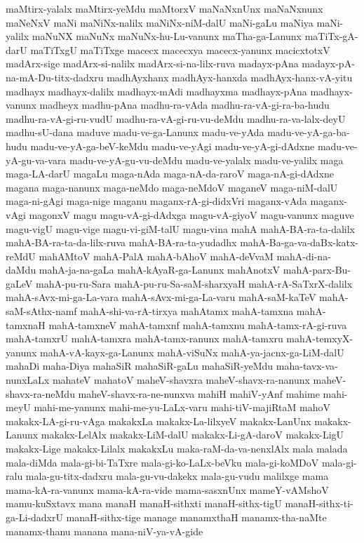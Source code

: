 {maMtirx-yalalx
maMtirx-yeMdu
maMtorxV
maNaNxnUnx
maNaNxnunx
maNeNxV
maNi
maNiNx-nalilx
maNiNx-niM-dalU
maNi-gaLu
maNiya
maNi-yalilx
maNuNX
maNuNx
maNuNx-hu-Lu-vanunx
maTha-ga-Lanunx
maTiTx-gA-darU
maTiTxgU
maTiTxge
macecx
macecxya
macecx-yanunx
macicxtotxV
madArx-sige
madArx-si-nalilx
madArx-si-na-lilx-ruva
madayx-pAna
madayx-pA-na-mA-Du-titx-dadxru
madhAyxhanx
madhAyx-hanxda
madhAyx-hanx-vA-yitu
madhayx
madhayx-dalilx
madhayx-mAdi
madhayxma
madhayx-pAna
madhayx-vanunx
madheyx
madhu-pAna
madhu-ra-vAda
madhu-ra-vA-gi-ra-ba-hudu
madhu-ra-vA-gi-ru-vudU
madhu-ra-vA-gi-ru-vu-deMdu
madhu-ra-va-lalx-deyU
madhu-sU-dana
maduve
madu-ve-ga-Lanunx
madu-ve-yAda
madu-ve-yA-ga-ba-hudu
madu-ve-yA-ga-beV-keMdu
madu-ve-yAgi
madu-ve-yA-gi-dAdxne
madu-ve-yA-gu-va-vara
madu-ve-yA-gu-vu-deMdu
madu-ve-yalalx
madu-ve-yalilx
maga
maga-LA-darU
magaLu
maga-nAda
maga-nA-da-raroV
maga-nA-gi-dAdxne
magana
maga-nanunx
maga-neMdo
maga-neMdoV
maganeV
maga-niM-dalU
maga-ni-gAgi
maga-nige
maganu
maganx-rA-gi-didxVri
maganx-vAda
maganx-vAgi
magonxV
magu
magu-vA-gi-dAdxga
magu-vA-giyoV
magu-vanunx
maguve
magu-vigU
magu-vige
magu-vi-giM-talU
magu-vina
mahA
mahA-BA-ra-ta-dalilx
mahA-BA-ra-ta-da-lilx-ruva
mahA-BA-ra-ta-yudadhx
mahA-Ba-ga-va-daBx-katx-reMdU
mahAMtoV
mahA-PalA
mahA-bAhoV
mahA-deVvaM
mahA-di-na-daMdu
mahA-ja-na-gaLa
mahA-kAyaR-ga-Lanunx
mahAnotxV
mahA-parx-Bu-gaLeV
mahA-pu-ru-Sara
mahA-pu-ru-Sa-saM-sharxyaH
mahA-rA-SaTxrX-dalilx
mahA-sAvx-mi-ga-La-vara
mahA-sAvx-mi-ga-La-varu
mahA-saM-kaTeV
mahA-saM-sAthx-namf
mahA-shi-va-rA-tirxya
mahAtamx
mahA-tamxna
mahA-tamxnaH
mahA-tamxneV
mahA-tamxnf
mahA-tamxnu
mahA-tamx-rA-gi-ruva
mahA-tamxrU
mahA-tamxra
mahA-tamx-ranunx
mahA-tamxru
mahA-temxyX-yanunx
mahA-vA-kayx-ga-Lanunx
mahA-viSuNx
mahA-ya-jacnx-ga-LiM-dalU
mahaDi
maha-Diya
mahaSiR
mahaSiR-gaLu
mahaSiR-yeMdu
maha-tavx-va-nunxLaLx
mahateV
mahatoV
maheV-shavxra
maheV-shavx-ra-nanunx
maheV-shavx-ra-neMdu
maheV-shavx-ra-ne-nunxva
mahiH
mahiV-yAnf
mahime
mahi-meyU
mahi-me-yanunx
mahi-me-yu-LaLx-varu
mahi-tiV-majiRtaM
mahoV
makakx-LA-gi-ru-vAga
makakxLa
makakx-La-lilxyeV
makakx-LanUnx
makakx-Lanunx
makakx-LelAlx
makakx-LiM-dalU
makakx-Li-gA-daroV
makakx-LigU
makakx-Lige
makakx-Lilalx
makakxLu
maka-raM-da-va-nenxlAlx
mala
malada
mala-diMda
mala-gi-bi-TaTxre
mala-gi-ko-LaLx-beVku
mala-gi-koMDoV
mala-gi-ralu
mala-gu-titx-dadxru
mala-gu-vu-dakekx
mala-gu-vudu
malilxge
mama
mama-kA-ra-vanunx
mama-kA-ra-vide
mama-sasxnUnx
mameY-vAMshoV
mamu-kuSxtavx
mana
manaH
manaH-sithxti
manaH-sithx-tigU
manaH-sithx-ti-ga-Li-dadxrU
manaH-sithx-tige
manage
manamxthaH
manamx-tha-naMte
manamx-thanu
manana
mana-niV-ya-vA-gide
}
